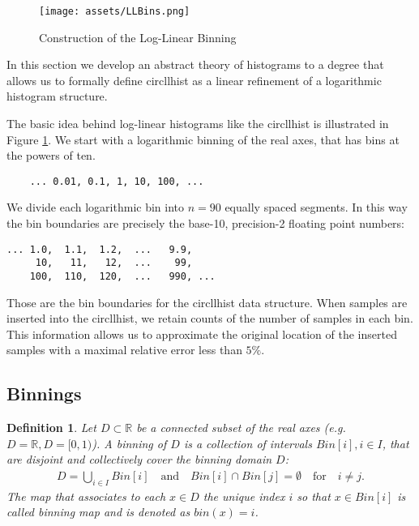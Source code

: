 \documentclass{article}
\theoremstyle{plain}
\newtheorem{definition}{Definition}[section]
\theoremstyle{remark}
\newcommand{\IR}{\mathbb{R}}
\newcommand{\Union}{\bigcup}
\newcommand{\qtext}[1]{\quad\text{#1}\quad} %
\begin{document}
\begin{figure}
  \texttt{[image: assets/LLBins.png]}
  \caption{Construction of the Log-Linear Binning}
  \label{fig:llbins}
\end{figure}

In this section we develop an abstract theory of histograms to a degree that allows us to
formally define circllhist as a linear refinement of a logarithmic histogram structure.

The basic idea behind log-linear histograms like the circllhist is illustrated in Figure \ref{fig:llbins}.
We start with a logarithmic binning of the real axes, that has bins at the powers of ten.
\begin{center}
  \begin{BVerbatim}
    ... 0.01, 0.1, 1, 10, 100, ...
  \end{BVerbatim}
\end{center}
We divide each logarithmic bin into $n=90$ equally spaced segments. In this way the bin boundaries
are precisely the base-10, precision-2 floating point numbers:
\begin{center}
\begin{BVerbatim}
... 1.0,  1.1,  1.2,  ...   9.9,
     10,   11,   12,  ...    99,
    100,  110,  120,  ...   990, ...
\end{BVerbatim}
\end{center}
Those are the bin boundaries for the circllhist data structure.
When samples are inserted into the circllhist, we retain counts of the number of samples in each bin.
This information allows us to approximate the original location of the inserted samples with a
maximal relative error less than $5\%$.

\subsection{Binnings}

\begin{definition}
  Let $D \subset \IR$ be a connected subset of the real axes (e.g. $D=\IR, D=[0,1)$).
  A binning of $D$ is a collection of intervals $Bin[i], i \in I$, that are disjoint and collectively cover the binning domain $D$:
  \begin{align*}
    D = \Union_{i\in I} Bin[i] \qtext{and} Bin[i] \cap Bin[j] = \emptyset \qtext{for} i \neq j.
  \end{align*}
  The map that associates to each $x \in D$ the unique index $i$ so that $x \in Bin[i]$ is called
  binning map and is denoted as $bin(x) = i$.
\end{definition}
\end{document}
